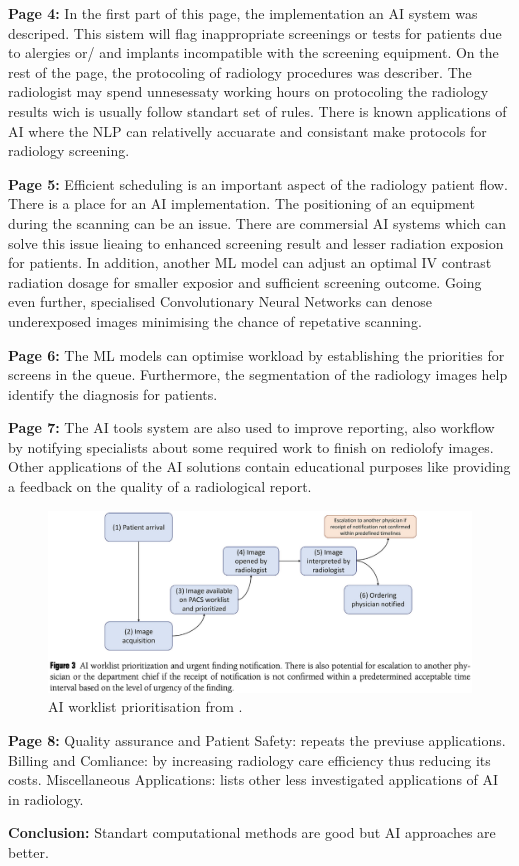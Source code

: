     \textbf{Page 4:}
    In the first part of this page, the implementation an AI system was descriped. This sistem will flag inappropriate screenings or tests for patients due to alergies or/ and implants incompatible with the screening equipment. On the rest of the page, the protocoling of radiology procedures was describer. The radiologist may spend unnesessaty working hours on protocoling the radiology results wich is usually follow standart set of rules. There is known applications of AI where the NLP can relativelly accuarate and consistant make protocols for radiology screening. 

    \textbf{Page 5:}
    Efficient scheduling is an important aspect of the radiology patient flow. There is a place for an AI implementation. The positioning of an equipment during the scanning can be an issue. There are commersial AI systems which can solve this issue lieaing to enhanced screening result and lesser radiation exposion for patients. In addition, another ML model can adjust an optimal IV contrast radiation dosage for smaller exposior and sufficient screening outcome. Going even further, specialised Convolutionary Neural Networks can denose underexposed  images minimising the chance of repetative scanning.
    
    \textbf{Page 6:}
    The ML models can optimise workload by establishing the priorities for screens in the queue. Furthermore, the segmentation of the radiology images help identify the diagnosis for patients.
    
    \textbf{Page 7:}
    The AI tools system are also used to improve reporting, also workflow by notifying specialists about some required work to finish on rediolofy images. Other applications of the AI solutions contain educational purposes like providing a feedback on the quality of a radiological report.
    \begin{figure}[H]
        \centering
        \includegraphics[width=1\textwidth]{figures/SR0012US23/fig3.png}
        \caption{AI worklist prioritisation from \cite{x076}.}
        \label{fig3:SR0012US23}
    \end{figure}

    \textbf{Page 8:}
    Quality assurance and Patient Safety: repeats the previuse applications. Billing and Comliance: by increasing radiology care efficiency thus reducing its costs. Miscellaneous Applications: lists other less investigated applications of AI in radiology.
    
    \textbf{Conclusion:}
    Standart computational methods are good but AI approaches are better.